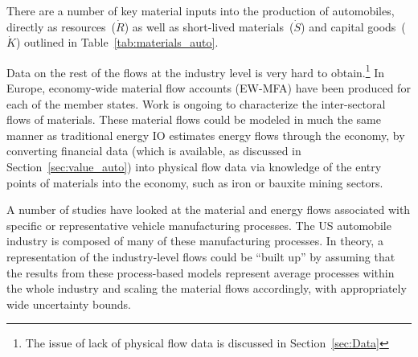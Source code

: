 There are a number of key material inputs into the
production of automobiles, directly as 
resources~($\dot{R}$) as well as short-lived 
materials~($\dot{S}$) and capital goods~($\dot{K}$)
outlined in Table~\ref{tab:materials_auto}. 



Data on the rest of the flows at the industry level
is very hard to obtain.\footnote{The issue of 
lack of physical flow data is discussed in 
Section~\ref{sec:Data}}
In Europe,
economy-wide material flow accounts (EW-MFA)
have been produced for each of the member 
states.\cite{EUROSTAT2011} 
Work is ongoing to characterize the inter-sectoral
flows of materials.\cite{ConAccount1998}
These material flows could be modeled in much the same
manner as traditional energy IO estimates energy flows
through the economy,
by converting financial data 
(which is available, as discussed in 
Section~\ref{sec:value_auto}) into physical flow data
via knowledge of the entry points of materials into the economy,
such as iron or bauxite mining sectors.

A number of studies have looked at 
the material and energy flows 
associated with specific or representative vehicle manufacturing 
processes.\cite{Sullivan1998, MacLean1998,Schweimer2000,
McCleese2002,MacLean2003, Burnham2006,Sullivan2010, Hawkins2012}
The US automobile industry is composed
of many of these manufacturing processes.
In theory,
a representation of the industry-level flows
could be ``built up'' by assuming that the results from
these process-based models represent average
processes within the whole industry and 
scaling the material flows accordingly,
with appropriately wide uncertainty bounds.



